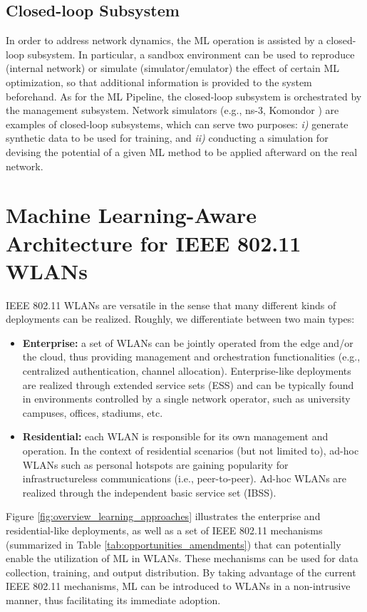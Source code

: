 \documentclass[journal]{IEEEtran}
\begin{document}
\subsection{Closed-loop Subsystem} 
In order to address network dynamics, the ML operation is assisted by a closed-loop subsystem. In particular, a sandbox environment can be used to reproduce (internal network) or simulate (simulator/emulator) the effect of certain ML optimization, so that additional information is provided to the system beforehand. As for the ML Pipeline, the closed-loop subsystem is orchestrated by the management subsystem. Network simulators (e.g., ns-3, Komondor \cite{barrachina2019komondor}) are examples of closed-loop subsystems, which can serve two purposes: \emph{i)} generate synthetic data to be used for training, and \emph{ii)} conducting a simulation for devising the potential of a given ML method to be applied afterward on the real network.

\section{Machine Learning-Aware Architecture for IEEE 802.11 WLANs}
\label{section:wlans_architecture}

IEEE 802.11 WLANs are versatile in the sense that many different kinds of deployments can be realized. Roughly, we differentiate between two main types:
\begin{itemize}
	\item \textbf{Enterprise:} a set of WLANs can be jointly operated from the edge and/or the cloud, thus providing management and orchestration functionalities (e.g., centralized authentication, channel allocation). Enterprise-like deployments are realized through extended service sets (ESS) and can be typically found in environments controlled by a single network operator, such as university campuses, offices, stadiums, etc. 
	\item \textbf{Residential:} each WLAN is responsible for its own management and operation. In the context of residential scenarios (but not limited to), ad-hoc WLANs such as personal hotspots are gaining popularity for infrastructureless communications (i.e., peer-to-peer). Ad-hoc WLANs are realized through the independent basic service set (IBSS).
\end{itemize}

Figure \ref{fig:overview_learning_approaches} illustrates the enterprise and residential-like deployments, as well as a set of IEEE 802.11 mechanisms (summarized in Table \ref{tab:opportunities_amendments}) that can potentially enable the utilization of ML in WLANs. These mechanisms can be used for data collection, training, and output distribution. By taking advantage of the current IEEE 802.11 mechanisms, ML can be introduced to WLANs in a non-intrusive manner, thus facilitating its immediate adoption. 
\end{document}
